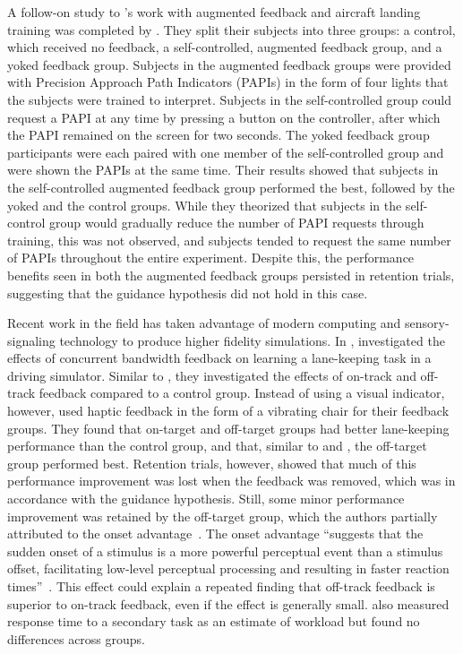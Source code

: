 A follow-on study to \citeauthor{doi:10.1177/001872088002200109}'s work with augmented feedback and aircraft landing training was completed by \citet{doi:10.1177/0018720809357343}.
They split their subjects into three groups: a control, which received no feedback, a self-controlled, augmented feedback group, and a yoked feedback group.
Subjects in the augmented feedback groups were provided with Precision Approach Path Indicators (PAPIs) in the form of four lights that the subjects were trained to interpret.
Subjects in the self-controlled group could request a PAPI at any time by pressing a button on the controller, after which the PAPI remained on the screen for two seconds.
The yoked feedback group participants were each paired with one member of the self-controlled group and were shown the PAPIs at the same time.
Their results showed that subjects in the self-controlled augmented feedback group performed the best, followed by the yoked and the control groups.
While they theorized that subjects in the self-control group would gradually reduce the number of PAPI requests through training, this was not observed, and subjects tended to request the same number of PAPIs throughout the entire experiment.
Despite this, the performance benefits seen in both the augmented feedback groups persisted in retention trials, suggesting that the guidance hypothesis did not hold in this case.

Recent work in the field has taken advantage of modern computing and sensory-signaling technology to produce higher fidelity simulations.
In \citeyear{de_groot_effect_2011}, \citeauthor{de_groot_effect_2011} investigated the effects of concurrent bandwidth feedback on learning a lane-keeping task in a driving simulator.
Similar to \citeauthor{gordon_effect_1967}, they investigated the effects of on-track and off-track feedback compared to a control group.
Instead of using a visual indicator, however, \citeauthor{de_groot_effect_2011} used haptic feedback in the form of a vibrating chair for their feedback groups.
They found that on-target and off-target groups had better lane-keeping performance than the control group, and that, similar to \citeauthor{gordon_effect_1967} and \citeauthor{williams_-target_1962}, the off-target group performed best.
Retention trials, however, showed that much of this performance improvement was lost when the feedback was removed, which was in accordance with the guidance hypothesis.
Still, some minor performance improvement was retained by the off-target group, which the authors partially attributed to the onset advantage~\citep{fischer_differential_2008}.
The onset advantage ``suggests that the sudden onset of a stimulus is a more powerful perceptual event than a stimulus offset, facilitating low-level perceptual processing and resulting in faster reaction times''~\citep{de_groot_effect_2011}.
This effect could explain a repeated finding that off-track feedback is superior to on-track feedback, even if the effect is generally small.
\citeauthor{de_groot_effect_2011} also measured response time to a secondary task as an estimate of workload but found no differences across groups.

